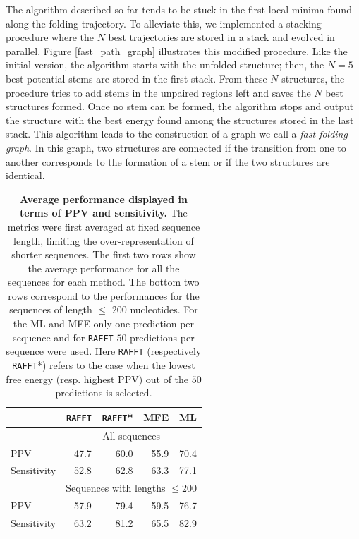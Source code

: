 The algorithm described so far tends to be stuck in the first local minima found along the folding trajectory. To alleviate this, we implemented a stacking procedure where the \(N\) best trajectories are stored in a stack and evolved in parallel. Figure \ref{fast_path_graph} illustrates this modified procedure. Like the initial version, the algorithm starts with the unfolded structure; then, the \(N=5\) best potential stems are stored in the first stack. From these \(N\) structures, the procedure tries to add stems in the unpaired regions left and saves the \(N\) best structures formed. Once no stem can be formed, the algorithm stops and output the structure with the best energy found among the structures stored in the last stack. This algorithm leads to the construction of a graph we call a \emph{fast-folding graph}. In this graph, two structures are connected if the transition from one to another corresponds to the formation of a stem or if the two structures are identical.

\begin{table}[htbp]
	\caption{\label{average_perf}\textbf{Average performance displayed in terms of PPV and sensitivity.} The metrics were first averaged at fixed sequence length, limiting the over-representation of shorter sequences. The first two rows show the average performance for all the sequences for each method. The bottom two rows correspond to the performances for the sequences of length \(\leq\) $200$ nucleotides. For the ML and MFE only one prediction per sequence and for \texttt{RAFFT} $50$ predictions per sequence were used. Here \texttt{RAFFT} (respectively \texttt{RAFFT}*) refers to the case when the lowest free energy (resp. highest PPV) out of the $50$ predictions is selected.}
	\centering
	\begin{tabular}{lrrrr}
		\hline
		& \texttt{RAFFT} & \texttt{RAFFT}* & MFE  & ML\\
		\hline
		& \multicolumn{4}{c}{All sequences}\\
		\cmidrule{2-5}
		PPV         & 47.7  & 60.0   & 55.9 & 70.4\\
		Sensitivity & 52.8  & 62.8   & 63.3 & 77.1\\
		\hline
		& \multicolumn{4}{c}{Sequences with lengths \(\leq 200\)}\\
		\cmidrule{2-5}
		PPV         & 57.9  & 79.4   & 59.5 & 76.7\\
		Sensitivity & 63.2  & 81.2   & 65.5 & 82.9\\
		\hline
	\end{tabular}
\end{table}


